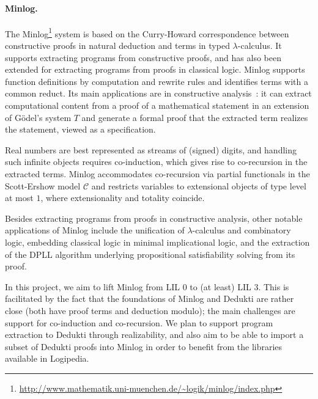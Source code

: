 \paragraph*{Minlog.}
The
Minlog\footnote{\url{http://www.mathematik.uni-muenchen.de/~logik/minlog/index.php}}
system is based on the Curry-Howard correspondence between constructive proofs
in natural deduction and terms in typed $\lambda$-calculus. It supports
extracting programs from constructive proofs, and has also been extended for extracting
programs from proofs in classical logic. Minlog supports function definitions by
computation and rewrite rules and identifies terms with a common reduct. Its
main applications are in constructive analysis~\cite{miyamoto:real}: it can extract
computational content from a proof of a mathematical statement in an extension
of G\"odel's system $T$ and generate a formal proof that the extracted term
realizes the statement, viewed as a specification.

Real numbers are best represented as streams of (signed) digits, and handling
such infinite objects requires co-induction, which gives rise to co-recursion in
the extracted terms. Minlog accommodates co-recursion via partial functionals in
the Scott-Ershow model $\mathcal{C}$ and restricts variables to extensional
objects of type level at most $1$, where extensionality and totality coincide.

Besides extracting programs from proofs in constructive analysis, other notable
applications of Minlog include the unification of $\lambda$-calculus and
combinatory logic, embedding classical logic in minimal implicational logic, and
the extraction of the DPLL algorithm underlying propositional satisfiability
solving from its proof.

In this project, we aim to lift Minlog from LIL $0$ to (at least) LIL $3$.
This is facilitated by the fact that the foundations of Minlog and Dedukti are
rather close (both have proof terms and deduction modulo); the main challenges
are support for co-induction and co-recursion. We plan to support program
extraction to Dedukti through realizability, and also aim to be able to
import a subset of Dedukti proofs into Minlog in order to benefit from the
libraries available in Logipedia.

